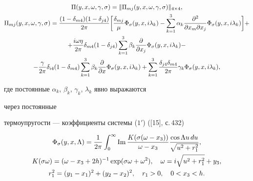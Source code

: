 \begin{gather} 


\Pi(y,x,\omega,\gamma,\sigma)=\|\Pi_{mj}(y,x,\omega,\gamma,\sigma) 


\|_{4\times 4}, \\ 


% 


\Pi_{mj}(y,x,\omega,\gamma,\sigma)= 


\frac{(1-\delta_{m4})(1-\delta_{j4})}{2\pi}\bigg[\frac{\delta_{mj}}{\mu} 


\Phi_\sigma(y,x,i\lambda_k)-\sum^3_{k=1}\alpha_k 


\frac{\partial^2}{\partial x_m\partial x_j}\Phi_\sigma 


(y,x,i\lambda_k)\bigg] + \notag \\ 


% 


+\frac{i\omega\eta}{2\pi}\delta_{m4}(1-\delta_{j4})\sum^3_{k=1} 


\beta_k\frac{\partial}{\partial x_j}\Phi_\sigma(y,x,i\lambda_k)-\notag \\ 


% 


-\frac{\gamma}{2\pi}\delta_{i4}(1-\delta_{m4})\sum^3_{k=1}\beta_k 


\frac{\partial}{\partial x}\Phi_\sigma(y,x,i\lambda_k)+ 


\sum^3_{k=1}\frac{\delta_{j4}\delta_{m4}}{2\pi}\gamma_k 


\Phi_\sigma(y,x,i\lambda_k),\notag 


\end{gather} 


где постоянные $\alpha_k$, $\beta_k$, $\gamma_k$, $\lambda_k$ явно выражаются 


через постоянные 


термоупругости --- коэффициенты системы ($1'$) ([15], с.\,432) 


\begin{gather} 


\Phi_\sigma(y,x,\Lambda)=\frac{1}{2\pi}\int^\infty_0\im 


\frac{K(\sigma(\omega-x_3))}{\omega-x_3} 


\frac{\cos\Lambda u\,du}{\sqrt{u^2+r^2_1}},\notag \\ 


% 


K(\sigma\omega)=(\omega-x_3+2h)^{-1}\exp(\sigma\omega+\omega^2),\quad 


\omega=i\sqrt{u^2+r^2_1}+y_3, \\ 


% 


r^2_1=(y_1-x_1)^2+(y_2-x_2)^2,\quad r_1>0,\quad 0<x_3<h.\notag 


\end{gather} 


